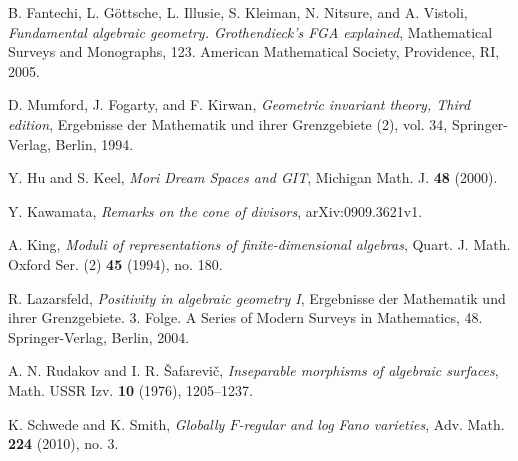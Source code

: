 \documentclass[12pt,twoside]{amsart}
\theoremstyle{definition}
\begin{document}
\begin{thebibliography}{HK}
 B. Fantechi, L. G\"{o}ttsche, L. Illusie, S. Kleiman, N. Nitsure, and A. Vistoli,
\textit{Fundamental algebraic geometry. Grothendieck's FGA explained},
Mathematical Surveys and Monographs, 123. American Mathematical Society,
Providence, RI, 2005.

 D. Mumford, J. Fogarty, and F. Kirwan, \textit{Geometric invariant theory,
Third edition}, Ergebnisse
der Mathematik und ihrer Grenzgebiete (2), vol. 34, Springer-Verlag, Berlin, 1994.

 Y. Hu and S. Keel, \textit{Mori Dream Spaces and GIT}, Michigan Math. J. \textbf{48} (2000).

 Y. Kawamata, \textit{Remarks on the cone of divisors},
arXiv:0909.3621v1.


 A. King, \textit{Moduli of representations of finite-dimensional algebras},
Quart. J. Math. Oxford Ser. (2) \textbf{45} (1994), no. 180.

 R. Lazarsfeld, \textit{Positivity in algebraic geometry I}, Ergebnisse der Mathematik und
ihrer Grenzgebiete. 3. Folge. A Series of Modern Surveys in Mathematics, 48. Springer-Verlag, Berlin, 2004. 


 A. N. Rudakov and I. R. \v{S}afarevi\v{c}, \textit{Inseparable morphisms of
algebraic surfaces}, Math. USSR Izv. \textbf{10} (1976), 1205--1237.

 K. Schwede and K. Smith, \textit{Globally $F$-regular and log Fano varieties},
Adv. Math. \textbf{224} (2010), no. 3.

\end{thebibliography}


 
\end{document}
